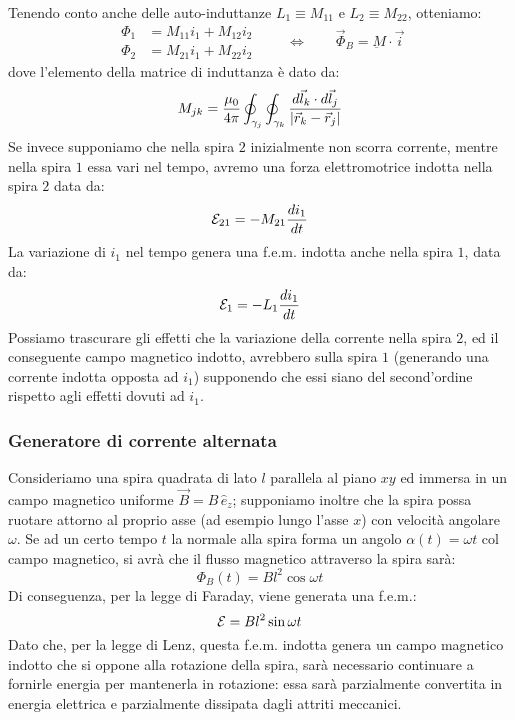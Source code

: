 Tenendo conto anche delle auto-induttanze $ L_1 \equiv M_{11} $ e $ L_2 \equiv M_{22} $, otteniamo:
\begin{equation}
	\begin{split}
		\Phi_1 &= M_{11} i_1 + M_{12} i_2 \\ 
		\Phi_2 &= M_{21} i_1 + M_{22} i_2
	\end{split}
	\qquad\Longleftrightarrow\qquad \vec{\Phi}_B = \underbar{M} \cdot \vec{i}
	\label{eq:23}
\end{equation}
dove l'elemento della matrice di induttanza è dato da:
\begin{equation}
	M_{jk} = \frac{\mu_0}{4\pi} \oint_{\gamma_j} \oint_{\gamma_k} \frac{d\vec{l}_k \cdot d\vec{l}_j}{\left\lvert\vec{r}_k - \vec{r}_j\right\rvert}
	\label{eq:24}
\end{equation}
%
Se invece supponiamo che nella spira $ 2 $ inizialmente non scorra corrente, mentre nella spira $ 1 $ essa vari nel tempo, avremo una forza elettromotrice indotta nella spira $ 2 $ data da:
\begin{equation}
	\mathcal{E}_{21} = - M_{21}\frac{di_1}{dt}
	\label{eq:25}
\end{equation}
La variazione di $ i_1 $ nel tempo genera una f.e.m. indotta anche nella spira $ 1 $, data da:
\begin{equation}
	\mathcal{E}_{1} = -L_1 \frac{di_1}{dt}
	\label{eq:26}
\end{equation}
Possiamo trascurare gli effetti che la variazione della corrente nella spira $ 2 $, ed il conseguente campo magnetico indotto, avrebbero sulla spira $ 1 $ (generando una corrente indotta opposta ad $ i_1 $) supponendo che essi siano del second'ordine rispetto agli effetti dovuti ad $ i_1 $.

\subsubsection{Generatore di corrente alternata}

Consideriamo una spira quadrata di lato $ l $ parallela al piano $ xy $ ed immersa in un campo magnetico uniforme $ \vec{B} = B \,\hat{e}_z $; supponiamo inoltre che la spira possa ruotare attorno al proprio asse (ad esempio lungo l'asse $ x $) con velocità angolare $ \omega $. Se ad un certo tempo $ t $ la normale alla spira forma un angolo $ \alpha(t) = \omega t $ col campo magnetico, si avrà che il flusso magnetico attraverso la spira sarà:
\begin{equation}
	\Phi_B (t) = Bl^2 \cos\omega t
	\label{eq:27}
\end{equation}
Di conseguenza, per la legge di Faraday, viene generata una f.e.m.:
\begin{equation}
	\mathcal{E} = Bl^2 \sin\omega t
	\label{eq:28}
\end{equation}
Dato che, per la legge di Lenz, questa f.e.m. indotta genera un campo magnetico indotto che si oppone alla rotazione della spira, sarà necessario continuare a fornirle energia per mantenerla in rotazione: essa sarà parzialmente convertita in energia elettrica e parzialmente dissipata dagli attriti meccanici.

